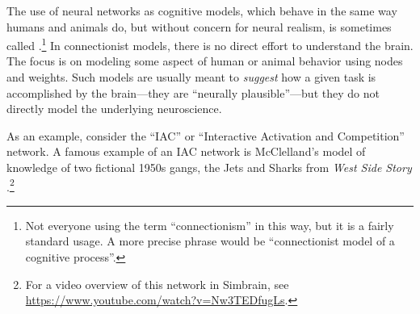 
The use of neural networks as cognitive models, which behave in the same way humans and animals do, but without concern for neural realism, is sometimes called .\footnote{Not everyone using the term ``connectionism'' in this way, but it is a fairly standard usage. A more precise phrase would be ``connectionist model of a cognitive process''.}  In connectionist models, there is no direct effort to understand the brain. The focus is on modeling some aspect of human or animal behavior using nodes and weights. Such models  are usually meant to {\em suggest} how a given task is accomplished by the brain---they are ``neurally plausible''---but they do not directly model the underlying neuroscience.

As an example, consider the ``IAC'' or ``Interactive Activation and Competition'' network. A famous example of an IAC network is McClelland's model of knowledge of two fictional 1950s gangs, the Jets and Sharks from {\em West Side Story} \cite{mcclelland1981retrieving}.\footnote{For a video overview of this network in Simbrain, see \url{https://www.youtube.com/watch?v=Nw3TEDfugLs}.}

